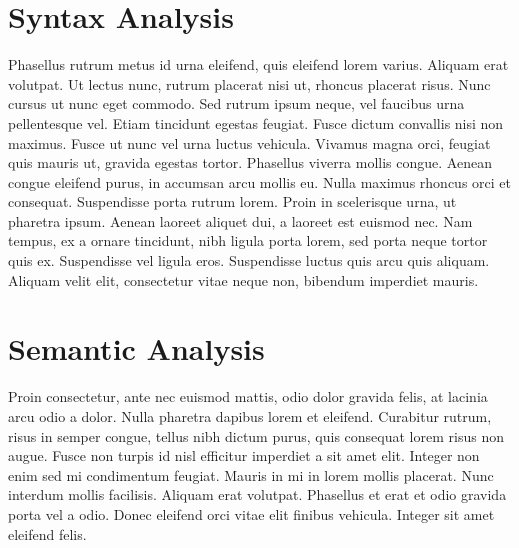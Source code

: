 \section{Syntax Analysis}
Phasellus rutrum metus id urna eleifend, quis eleifend lorem varius. Aliquam erat volutpat. Ut lectus nunc, rutrum placerat nisi ut, rhoncus placerat risus. Nunc cursus ut nunc eget commodo. Sed rutrum ipsum neque, vel faucibus urna pellentesque vel. Etiam tincidunt egestas feugiat. Fusce dictum convallis nisi non maximus. Fusce ut nunc vel urna luctus vehicula. Vivamus magna orci, feugiat quis mauris ut, gravida egestas tortor.
Phasellus viverra mollis congue. Aenean congue eleifend purus, in accumsan arcu mollis eu. Nulla maximus rhoncus orci et consequat. Suspendisse porta rutrum lorem. Proin in scelerisque urna, ut pharetra ipsum. Aenean laoreet aliquet dui, a laoreet est euismod nec. Nam tempus, ex a ornare tincidunt, nibh ligula porta lorem, sed porta neque tortor quis ex. Suspendisse vel ligula eros. Suspendisse luctus quis arcu quis aliquam. Aliquam velit elit, consectetur vitae neque non, bibendum imperdiet mauris.


\section{Semantic Analysis}
Proin consectetur, ante nec euismod mattis, odio dolor gravida felis, at lacinia arcu odio a dolor. Nulla pharetra dapibus lorem et eleifend. Curabitur rutrum, risus in semper congue, tellus nibh dictum purus, quis consequat lorem risus non augue. Fusce non turpis id nisl efficitur imperdiet a sit amet elit. Integer non enim sed mi condimentum feugiat. Mauris in mi in lorem mollis placerat. Nunc interdum mollis facilisis. Aliquam erat volutpat. Phasellus et erat et odio gravida porta vel a odio. Donec eleifend orci vitae elit finibus vehicula. Integer sit amet eleifend felis.


